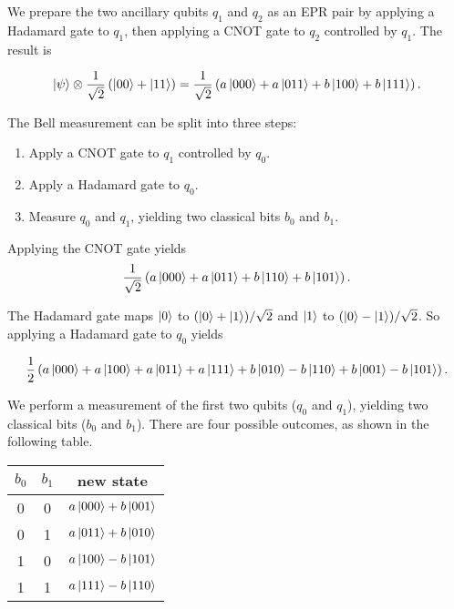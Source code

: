 \documentclass[12pt,letterpaper]{article}
\newcommand\tensor{\otimes}
\begin{document}
We prepare the two ancillary qubits $q_1$ and $q_2$ as an EPR pair by applying 
a Hadamard gate to $q_1$, then applying a CNOT gate to $q_2$ controlled
by $q_1$. The result is

\begin{equation}
	\ket{\psi} \tensor \frac1{\sqrt2} \left( \ket{00} + \ket{11} \right)
  = \frac1{\sqrt2} \left(a\ket{000} + a\ket{011} + b\ket{100} + b\ket{111}\right).
\end{equation}

The Bell measurement can be split into three steps:
\begin{enumerate}
	\item Apply a CNOT gate to $q_1$ controlled by $q_0$.
	\item Apply a Hadamard gate to $q_0$.
	\item Measure $q_0$ and $q_1$, yielding two classical bits $b_0$ and $b_1$.
\end{enumerate}

Applying the CNOT gate yields
\begin{equation}
	\frac1{\sqrt2} \left( a\ket{000} + a\ket{011} + b\ket{110} + b\ket{101}\right).
\end{equation}

The Hadamard gate maps $\ket{0}$ to $(\ket{0}+\ket{1})/\sqrt{2}$
and $\ket{1}$ to $(\ket{0} - \ket{1})/\sqrt2$. So applying a Hadamard gate to $q_0$ yields

\begin{equation}
\frac12 \left( a\ket{000} + a\ket{100} + a\ket{011} + a\ket{111} +
               b\ket{010} - b\ket{110} + b\ket{001} - b\ket{101}\right).
\end{equation}

We perform a measurement of the first two qubits ($q_0$ and $q_1$), yielding two classical bits
($b_0$ and $b_1$). There are four possible outcomes, as shown in the following table.

\begin{center}
\begin{tabular}{|c|c|c|}
\hline
$b_0$ & $b_1$ & new state \\
\hline
0 & 0 & $a\ket{000} + b\ket{001}$ \\
0 & 1 & $a\ket{011} + b\ket{010}$ \\
1 & 0 & $a\ket{100} - b\ket{101}$ \\
1 & 1 & $a\ket{111} - b\ket{110}$ \\
\hline
\end{tabular}
\end{center}
\end{document}
